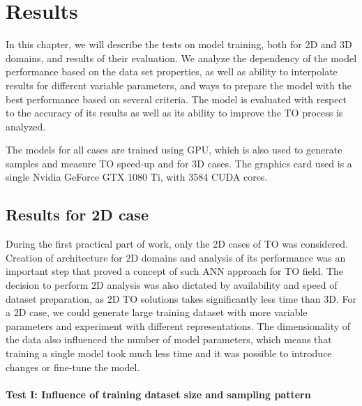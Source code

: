 
\chapter{Results}
\label{chapter:Results}

In this chapter, we will describe the tests on model training, both for 2D and 3D domains, and results of their evaluation.
We analyze the dependency of the model performance based on the data set properties, as well as ability to interpolate results for different variable parameters, and ways to prepare the model with the best performance based on several criteria. 
The model is evaluated with respect to the accuracy of its results as well as its ability to improve the TO process is analyzed.
\medskip

The models for all cases are trained using GPU, which is also used to generate samples and measure TO speed-up and for 3D cases.
The graphics card used is a single Nvidia GeForce GTX 1080 Ti, with 3584 CUDA cores. 


\section{Results for 2D case}

During the first practical part of work, only the 2D cases of TO was considered.
Creation of architecture for 2D domains and analysis of its performance was an important step that proved a concept of such ANN approach for TO field.
The decision to perform 2D analysis was also dictated by availability and speed of dataset preparation, as 2D TO solutions takes significantly less time than 3D. 
For a 2D case, we could generate large training dataset with more variable parameters and experiment with different representations.
The dimensionality of the data also influenced the number of model parameters, which means that training a single model took much less time and it was possible to introduce changes or fine-tune the model.

\medskip

\subsubsection{Test I: Influence of training dataset size and sampling pattern}


